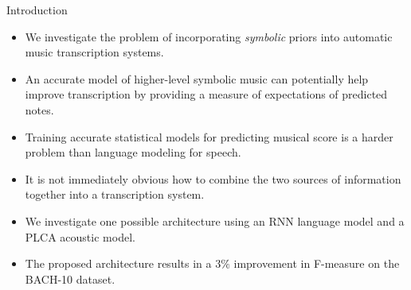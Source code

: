 \documentclass[final]{beamer}
\newlength{\onecolwid}
\begin{document}
\begin{frame}[t]
\begin{columns}[t]
\begin{column}{\onecolwid}
\begin{block}{Introduction}

\begin{itemize}
\item We investigate the problem of incorporating \emph{symbolic} priors into automatic music transcription systems.
\item An accurate model of higher-level symbolic music can potentially help improve transcription by providing a measure of expectations of predicted notes. 
\item Training accurate statistical models for predicting musical score is a harder problem than language modeling for speech. 
\item It is not immediately obvious how to combine the two sources of information together into a transcription system. 
\item We investigate one possible architecture using an RNN language model and a PLCA acoustic model. 
\item The proposed architecture results in a $3\%$ improvement in F-measure on the BACH-10 dataset. 
\end{itemize}

\end{block}




\end{column}
\end{columns}
\end{frame}
\end{document}
